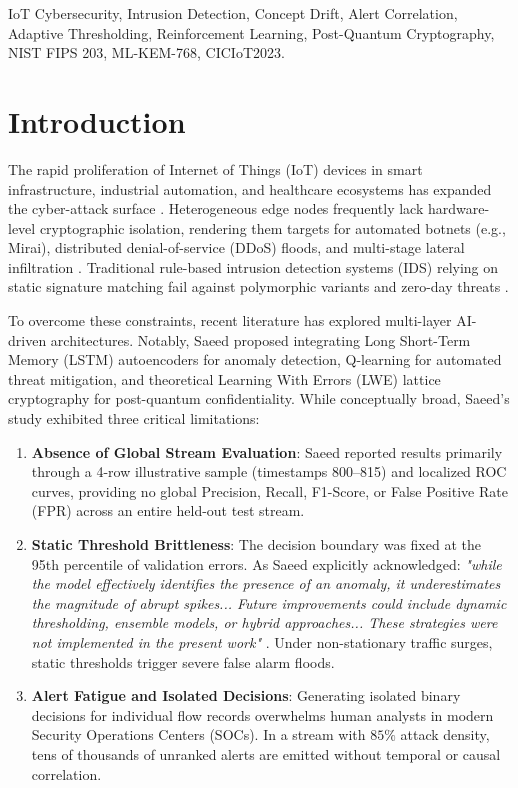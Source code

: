 \documentclass{ieeeaccess}
\begin{document}
\begin{keywords}
IoT Cybersecurity, Intrusion Detection, Concept Drift, Alert Correlation, Adaptive Thresholding, Reinforcement Learning, Post-Quantum Cryptography, NIST FIPS 203, ML-KEM-768, CICIoT2023.
\end{keywords}

\titlepgskip=-15pt
\maketitle

\section{Introduction}
\label{sec:introduction}
The rapid proliferation of Internet of Things (IoT) devices in smart infrastructure, industrial automation, and healthcare ecosystems has expanded the cyber-attack surface \cite{alcaraz2023,kumar2019}. Heterogeneous edge nodes frequently lack hardware-level cryptographic isolation, rendering them targets for automated botnets (e.g., Mirai), distributed denial-of-service (DDoS) floods, and multi-stage lateral infiltration \cite{bertino2017,kolias2017}. Traditional rule-based intrusion detection systems (IDS) relying on static signature matching fail against polymorphic variants and zero-day threats \cite{roesch1999}.

To overcome these constraints, recent literature has explored multi-layer AI-driven architectures. Notably, Saeed \cite{saeed2025} proposed integrating Long Short-Term Memory (LSTM) autoencoders for anomaly detection, Q-learning for automated threat mitigation, and theoretical Learning With Errors (LWE) lattice cryptography for post-quantum confidentiality. While conceptually broad, Saeed's study exhibited three critical limitations:
\begin{enumerate}
    \item \textbf{Absence of Global Stream Evaluation}: Saeed reported results primarily through a 4-row illustrative sample (timestamps 800--815) and localized ROC curves, providing no global Precision, Recall, F1-Score, or False Positive Rate (FPR) across an entire held-out test stream.
    \item \textbf{Static Threshold Brittleness}: The decision boundary was fixed at the 95th percentile of validation errors. As Saeed explicitly acknowledged: \textit{"while the model effectively identifies the presence of an anomaly, it underestimates the magnitude of abrupt spikes... Future improvements could include dynamic thresholding, ensemble models, or hybrid approaches... These strategies were not implemented in the present work"} \cite{saeed2025}. Under non-stationary traffic surges, static thresholds trigger severe false alarm floods.
    \item \textbf{Alert Fatigue and Isolated Decisions}: Generating isolated binary decisions for individual flow records overwhelms human analysts in modern Security Operations Centers (SOCs). In a stream with $85\%$ attack density, tens of thousands of unranked alerts are emitted without temporal or causal correlation.
\end{enumerate}
\end{document}
